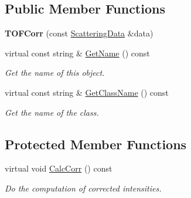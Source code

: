 \subsection*{Public Member Functions}
\begin{DoxyCompactItemize}
\item 
\mbox{\label{class_obj_cryst_1_1_t_o_f_corr_afceb96fa351306b6bb3ca787dc56d5fc}} 
{\bfseries T\+O\+F\+Corr} (const \mbox{\hyperlink{class_obj_cryst_1_1_scattering_data}{Scattering\+Data}} \&data)
\item 
\mbox{\label{class_obj_cryst_1_1_t_o_f_corr_a0f006d14612e439b1ae8bb5c6afcad79}} 
virtual const string \& \mbox{\hyperlink{class_obj_cryst_1_1_t_o_f_corr_a0f006d14612e439b1ae8bb5c6afcad79}{Get\+Name}} () const
\begin{DoxyCompactList}\small\item\em Get the name of this object. \end{DoxyCompactList}\item 
\mbox{\label{class_obj_cryst_1_1_t_o_f_corr_a59d9a78cc7e2323371a82ab2405f3b1a}} 
virtual const string \& \mbox{\hyperlink{class_obj_cryst_1_1_t_o_f_corr_a59d9a78cc7e2323371a82ab2405f3b1a}{Get\+Class\+Name}} () const
\begin{DoxyCompactList}\small\item\em Get the name of the class. \end{DoxyCompactList}\end{DoxyCompactItemize}
\subsection*{Protected Member Functions}
\begin{DoxyCompactItemize}
\item 
\mbox{\label{class_obj_cryst_1_1_t_o_f_corr_a56bc687d4b6b9d7fe3a2bcce0cb7d3a4}} 
virtual void \mbox{\hyperlink{class_obj_cryst_1_1_t_o_f_corr_a56bc687d4b6b9d7fe3a2bcce0cb7d3a4}{Calc\+Corr}} () const
\begin{DoxyCompactList}\small\item\em Do the computation of corrected intensities. \end{DoxyCompactList}\end{DoxyCompactItemize}
